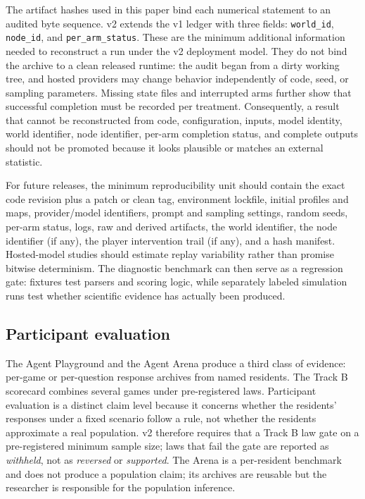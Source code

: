 The artifact hashes used in this paper bind each numerical statement to
an audited byte sequence.  v2 extends the v1 ledger with three fields:
\texttt{world\_id}, \texttt{node\_id}, and \texttt{per\_arm\_status}.
These are the minimum additional information needed to reconstruct a
run under the v2 deployment model.  They do not bind the archive to a
clean released runtime: the audit began from a dirty working tree, and
hosted providers may change behavior independently of code, seed, or
sampling parameters.  Missing state files and interrupted arms further
show that successful completion must be recorded per treatment.
Consequently, a result that cannot be reconstructed from code,
configuration, inputs, model identity, world identifier, node
identifier, per-arm completion status, and complete outputs should not
be promoted because it looks plausible or matches an external statistic.

For future releases, the minimum reproducibility unit should contain the
exact code revision plus a patch or clean tag, environment lockfile,
initial profiles and maps, provider/model identifiers, prompt and
sampling settings, random seeds, per-arm status, logs, raw and derived
artifacts, the world identifier, the node identifier (if any), the
player intervention trail (if any), and a hash manifest.  Hosted-model
studies should estimate replay variability rather than promise bitwise
determinism.  The diagnostic benchmark can then serve as a regression
gate: fixtures test parsers and scoring logic, while separately labeled
simulation runs test whether scientific evidence has actually been
produced.

\subsection{Participant evaluation}

The Agent Playground and the Agent Arena produce a third class of
evidence: per-game or per-question response archives from named
residents.  The Track B scorecard combines several games under
pre-registered laws.  Participant evaluation is a distinct claim level
because it concerns whether the residents' responses under a fixed
scenario follow a rule, not whether the residents approximate a real
population.  v2 therefore requires that a Track B law gate on a
pre-registered minimum sample size; laws that fail the gate are
reported as \emph{withheld}, not as \emph{reversed} or
\emph{supported}.  The Arena is a per-resident benchmark and does not
produce a population claim; its archives are reusable but the
researcher is responsible for the population inference.

